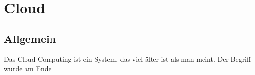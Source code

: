 \section{Cloud}
\subsection{Allgemein}
Das Cloud Computing ist ein System, das viel älter ist als man meint. Der Begriff wurde am Ende  